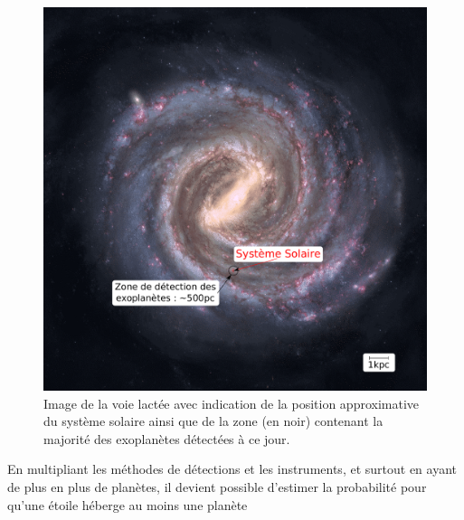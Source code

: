 \begin{figure}[htb]
\centering
\includegraphics[width=0.45\linewidth]{figure/milky_way_exoplanets.pdf}%
\caption{Image de la voie lactée avec indication de la position approximative du système solaire ainsi que de la zone (en noir) contenant la majorité des exoplanètes détectées à ce jour.}\label{fig:milky_way_exoplanet}
\end{figure}


En multipliant les méthodes de détections et les instruments, et surtout en ayant de plus en plus de planètes, il devient possible d'estimer la probabilité pour qu'une étoile héberge au moins une planète \citep{mayor2011road}

